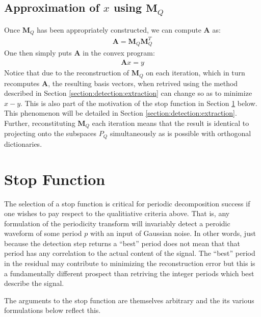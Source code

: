     \subsection{Approximation of $x$ using $\bm{M}_Q$}
    Once $\bm{M}_Q$ has been appropriately constructed, we can compute $\bm{A}$ as:
    \begin{align}
        \bm{A} = \bm{M}_Q \bm{M}_Q^T
    \end{align}
    One then simply puts $\bm{A}$ in the convex program:
    \begin{align*}
        \bm{A}x = y
    \end{align*}
    Notice that due to the reconstruction of $\bm{M}_Q$ on each iteration, which in turn recomputes $\bm{A}$, the resulting basis vectors, when retrived using the method described in Section \ref{section:detection:extraction} can change so as to minimize $x - y$. This is also part of the motivation of the stop function in Section \ref{section:detection:stopFunction} below. This phenomenon will be detailed in Section \ref{section:detection:extraction}. Further, reconstituting $\bm{M}_Q$ each iteration means that the result is identical to projecting onto the subspaces $P_Q$ simultaneously as is possible with orthogonal dictionaries.

\section{Stop Function}\label{section:detection:stopFunction}
The selection of a stop function is critical for periodic decomposition success if one wishes to pay respect to the qualitiative criteria above. That is, any formulation of the periodicity transform will invariably detect a peroidic waveform of some period $p$ with an input of Gaussian noise. In other words, just because the detection step returns a ``best'' period does not mean that that period has any correlation to the actual content of the signal. The ``best'' period in the residual may contribute to minimizing the reconstruction error but this is a fundamentally different prospect than retriving the integer periods which best describe the signal.

The arguments to the stop function are themselves arbitrary and the its various formulations below reflect this.

